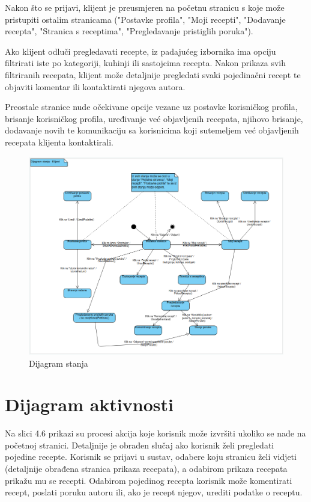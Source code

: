 		\noindent Nakon što se prijavi, klijent je preusmjeren na početnu stranicu s koje može
		pristupiti ostalim stranicama ("Postavke profila", "Moji recepti", "Dodavanje recepta", "Stranica s receptima",
		"Pregledavanje pristiglih poruka").

		\noindent Ako klijent odluči pregledavati recepte, iz padajućeg izbornika ima opciju
		filtrirati iste po kategoriji, kuhinji ili sastojcima recepta. Nakon prikaza svih filtriranih
		recepata, klijent može detaljnije pregledati svaki pojedinačni recept te objaviti komentar ili
		kontaktirati njegova autora.

		\noindent Preostale stranice nude očekivane opcije vezane uz postavke korisničkog profila,
		brisanje korisničkog profila, uređivanje već objavljenih recepata, njihovo brisanje, dodavanje novih
		te komunikaciju sa korisnicima koji sutemeljem već objavljenih recepata klijenta kontaktirali.

		\begin{figure}[H]
			\includegraphics[scale=0.42]{dijagrami/dijagram_stanja.png}
			\centering
			\caption{Dijagram stanja}
			\label{fig:bpdiag}
		\end{figure}
		\eject
		
		\section{Dijagram aktivnosti}

		\noindent Na slici 4.6 prikazi su procesi akcija koje korisnik može izvršiti ukoliko se nađe na početnoj stranici.
		Detaljnije je obrađen slučaj ako korisnik želi pregledati pojedine recepte.
		Korisnik se prijavi u sustav, odabere koju stranicu želi vidjeti (detaljnije obrađena stranica prikaza recepata),
		a odabirom prikaza recepata prikažu mu se recepti. Odabirom pojedinog recepta korisnik može komentirati recept,
		poslati poruku autoru ili, ako je recept njegov, urediti podatke o receptu.

